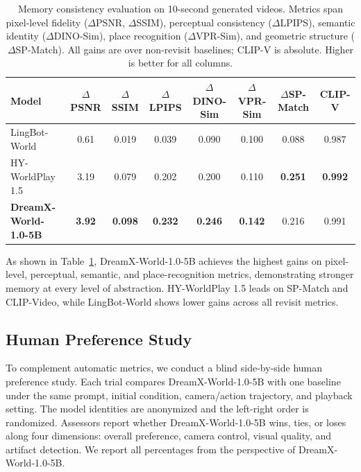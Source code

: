 \documentclass{llmxive}
\providecommand{\arraystretch}{1}
\providecommand{\evalmodel}{DreamX-World-1.0-5B}
\begin{document}
\begin{table}[!htbp]
\centering
\renewcommand{\arraystretch}{1.1}
\setlength{\tabcolsep}{3.5pt}
\footnotesize
\begin{tabular}{@{}lccccccc@{}}
\toprule
\rowcolor{amapblue}
\textbf{Model} &
$\Delta$\textbf{PSNR} &
$\Delta$\textbf{SSIM} &
$\Delta$\textbf{LPIPS} &
$\Delta$\textbf{DINO-Sim} &
$\Delta$\textbf{VPR-Sim} &
$\Delta$\textbf{SP-Match} &
\textbf{CLIP-V} \\
\midrule
\rowcolor{TableRowAlt}
LingBot-World & 0.61 & 0.019 & 0.039 & 0.090 & 0.100 & 0.088 & 0.987 \\
HY-WorldPlay 1.5 & 3.19 & 0.079 & 0.202 & 0.200 & 0.110 & \textbf{0.251} & \textbf{0.992} \\
\midrule
\rowcolor{TableRowAlt}
\textbf{\evalmodel{}} & \textbf{3.92} & \textbf{0.098} & \textbf{0.232} & \textbf{0.246} & \textbf{0.142} & 0.216 & 0.991 \\
\bottomrule
\end{tabular}
\caption{Memory consistency evaluation on 10-second generated videos.
Metrics span pixel-level fidelity ($\Delta$PSNR, $\Delta$SSIM),
perceptual consistency ($\Delta$LPIPS),
semantic identity ($\Delta$DINO-Sim),
place recognition ($\Delta$VPR-Sim),
and geometric structure ($\Delta$SP-Match).
All gains are over non-revisit baselines; CLIP-V is absolute.
Higher is better for all columns.}
\label{tab:memory-consistency}
\end{table}

As shown in Table~\ref{tab:memory-consistency},
\evalmodel{} achieves the highest gains on pixel-level, perceptual,
semantic, and place-recognition metrics,
demonstrating stronger memory at every level of abstraction.
HY-WorldPlay 1.5 leads on SP-Match and CLIP-Video,
while LingBot-World shows lower gains across all revisit metrics.

\subsection{Human Preference Study}
\label{sec:user-study}

To complement automatic metrics, we conduct a blind side-by-side human
preference study. Each trial compares \evalmodel{} with one baseline under the
same prompt, initial condition, camera/action trajectory, and playback setting.
The model identities are anonymized and the left-right order is randomized.
Assessors report whether \evalmodel{} wins, ties, or loses along four dimensions:
overall preference, camera control, visual quality, and artifact detection. We
report all percentages from the perspective of \evalmodel{}.
\end{document}
